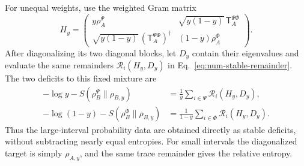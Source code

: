 \documentclass[11pt]{article}
\begin{document}
For unequal weights, use the weighted Gram matrix
\begin{equation}
 H_y=\begin{pmatrix}
 y\rho_A^\Psi&\sqrt{y(1-y)}\,\mathsf T_A^{\Psi\Phi}\\
 \sqrt{y(1-y)}\,(\mathsf T_A^{\Psi\Phi})^\dagger&(1-y)\rho_A^\Phi
 \end{pmatrix}.
 \label{eq:num-weighted-gram}
\end{equation}
After diagonalizing its two diagonal blocks, let $D_y$ contain
their eigenvalues and evaluate the same remainders
$\mathcal R_i(H_y,D_y)$ in Eq.~\eqref{eq:num-stable-remainder}.
The two deficits to this fixed mixture are
\begin{align}
 -\log y-S(\rho_B^\Psi\|\rho_{B,y})
 &=\frac1y\sum_{i\in\Psi}\mathcal R_i(H_y,D_y),\nonumber\\
 -\log(1-y)-S(\rho_B^\Phi\|\rho_{B,y})
 &=\frac1{1-y}\sum_{i\in\Phi}\mathcal R_i(H_y,D_y).
 \label{eq:num-weighted-deficit}
\end{align}
Thus the large-interval probability data are obtained directly as
stable deficits, without subtracting nearly equal entropies.
For small intervals the diagonalized target is simply
$\rho_{A,y}$, and the same trace remainder gives the relative entropy.
\end{document}
